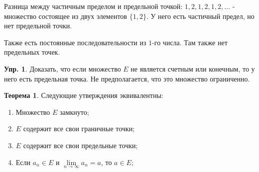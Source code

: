 \documentclass[12pt]{article}
\theoremstyle{definition}
\newtheorem{exrc}{Упр.}
\newtheorem{theorem}{Теорема}
\begin{document}
Разница между частичным пределом и предельной точкой: $1, 2, 1, 2, 1, 2, \dotsc$ - множество состоящее из двух элементов $\{1,2\}$. У него есть частичный предел, но нет предельной точки.

Также есть постоянные последовательности из $1$-го числа. Там также нет предельных точек.

\begin{exrc}
	Доказать, что если множество $E$ не является счетным или конечным, то у него есть предельная точка. Не предполагается, что это множество ограниченно.
\end{exrc}

\begin{theorem}
	Следующие утверждения эквивалентны:
	\begin{enumerate}[label={(\arabic*)}]
		\item Множество $E$ замкнуто;
		\item $E$ содержит все свои граничные точки;
		\item $E$ содержит все свои предельные точки;
		\item Если $a_n \in E$ и $\lim\limits_{n \to \infty} a_n = a$, то $a \in E$;	
	\end{enumerate}
\end{theorem}
\end{document}
